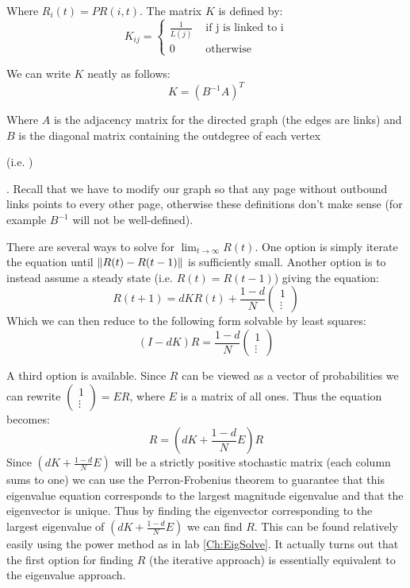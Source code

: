 Where $R_i(t) = PR(i,t)$. The matrix $K$ is defined by:
\[
K_{ij} = \begin{cases} \frac{1}{L(j)} & \mbox{ if j is linked to i} \\ 0 & \mbox{ otherwise} \end{cases}
\]

We can write $K$ neatly as follows:
\[
K = (B^{-1}A)^T
\]

Where $A$ is the adjacency matrix for the directed graph (the edges are links) and $B$ is the diagonal matrix containing the outdegree of each vertex\begin{matlab} (i.e. )\end{matlab}. Recall that we have to modify our graph so that any page without outbound links points to every other page, otherwise these definitions don't make sense (for example $B^{-1}$ will not be well-defined).

There are several ways to solve for $\lim_{t \to \infty} R(t)$. One option is simply iterate the equation until $\lVert R(t)-R(t-1)\rVert$ is sufficiently small. Another option is to instead assume a steady state (i.e. $R(t) = R(t-1)$) giving the equation:
\[
R(t+1) = d K R(t) + \frac{1-d}{N} \begin{pmatrix}1\\\vdots\end{pmatrix}
\]
Which we can then reduce to the following form solvable by least squares:
\[
(I-dK)R = \frac{1-d}{N} \begin{pmatrix}1\\\vdots\end{pmatrix}
\]

A third option is available. Since $R$ can be viewed as a vector of probabilities we can rewrite $\left(\begin{smallmatrix}1\\\vdots\end{smallmatrix}\right) = E R$, where $E$ is a matrix of all ones. Thus the equation becomes:
\[
R = (dK + \frac{1-d}{N}E)R
\]
Since $(dK + \frac{1-d}{N}E)$ will be a strictly positive stochastic matrix (each column sums to one) we can use the Perron-Frobenius theorem to guarantee that this eigenvalue equation corresponds to the largest magnitude eigenvalue and that the eigenvector is unique. Thus by finding the eigenvector corresponding to the largest eigenvalue of $(dK + \frac{1-d}{N}E)$ we can find $R$. This can be found relatively easily using the power method as in lab \ref{Ch:EigSolve}. It actually turns out that the first option for finding $R$ (the iterative approach) is essentially equivalent to the eigenvalue approach.

